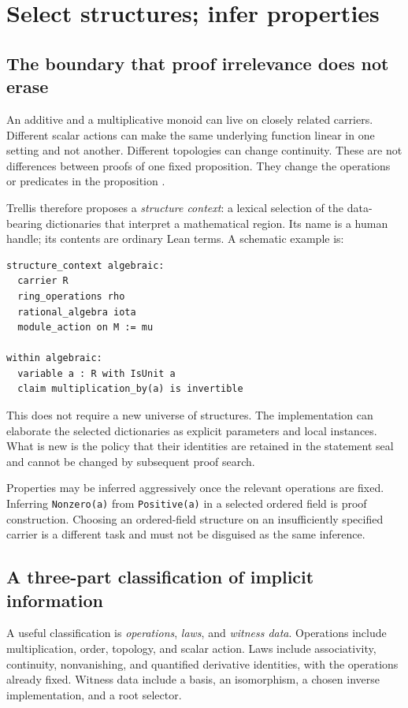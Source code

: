 \documentclass[11pt,a4paper]{article}
\theoremstyle{definition}
\theoremstyle{remark}
\newcommand{\code}[1]{\texttt{#1}}
\begin{document}
\section{Select structures; infer properties}
\label{sec:structures}

\subsection{The boundary that proof irrelevance does not erase}
An additive and a multiplicative monoid can live on closely related carriers. Different scalar actions can make the same underlying function linear in one setting and not another. Different topologies can change continuity. These are not differences between proofs of one fixed proposition. They change the operations or predicates in the proposition \cite{leanClasses}.

Trellis therefore proposes a \emph{structure context}: a lexical selection of the data-bearing dictionaries that interpret a mathematical region. Its name is a human handle; its contents are ordinary Lean terms. A schematic example is:
\begin{lstlisting}
structure_context algebraic:
  carrier R
  ring_operations rho
  rational_algebra iota
  module_action on M := mu

within algebraic:
  variable a : R with IsUnit a
  claim multiplication_by(a) is invertible
\end{lstlisting}
This does not require a new universe of structures. The implementation can elaborate the selected dictionaries as explicit parameters and local instances. What is new is the policy that their identities are retained in the statement seal and cannot be changed by subsequent proof search.

Properties may be inferred aggressively once the relevant operations are fixed. Inferring \code{Nonzero(a)} from \code{Positive(a)} in a selected ordered field is proof construction. Choosing an ordered-field structure on an insufficiently specified carrier is a different task and must not be disguised as the same inference.

\subsection{A three-part classification of implicit information}
A useful classification is \emph{operations}, \emph{laws}, and \emph{witness data}. Operations include multiplication, order, topology, and scalar action. Laws include associativity, continuity, nonvanishing, and quantified derivative identities, with the operations already fixed. Witness data include a basis, an isomorphism, a chosen inverse implementation, and a root selector.
\end{document}
